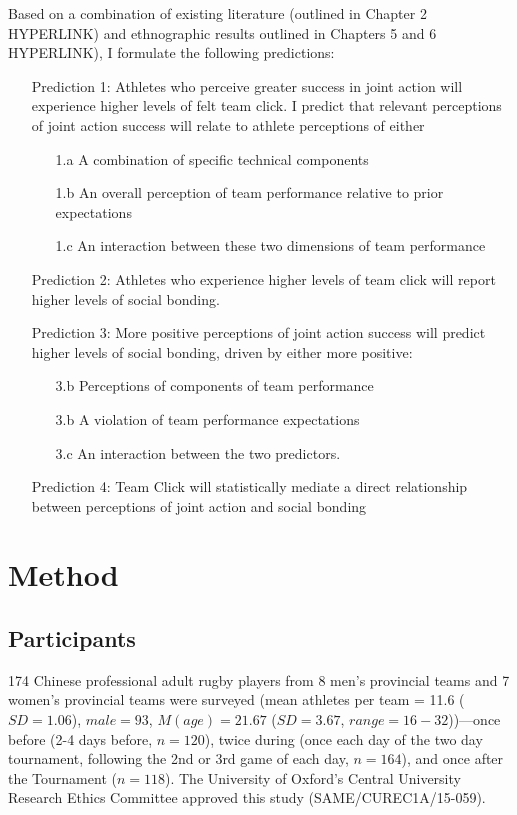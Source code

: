 \begin{CJK}{UTF8}{gbsn}
Based on a combination of existing literature (outlined in Chapter 2 HYPERLINK) and ethnographic results outlined in Chapters 5 and 6 HYPERLINK), I formulate the following predictions:

\begin{itemize}
  \item[Prediction 1:] Athletes who perceive greater success in joint action will experience higher levels of felt team click. I predict that relevant perceptions of joint action success will relate to athlete perceptions of either
      \begin{itemize}
        \item[1.a] A combination of specific technical components
        \item[1.b] An overall perception of team performance relative to prior expectations
        \item[1.c] An interaction between these two dimensions of team performance
      \end{itemize}
  \item[Prediction 2:] Athletes who experience higher levels of team click will report higher levels of social bonding.
  \item[Prediction 3:] More positive perceptions of joint action success will predict higher levels of social bonding, driven by either more positive:
    \begin{itemize}
        \item[3.b] Perceptions of components of team performance
    	  \item[3.b] A violation of team performance expectations
        \item[3.c] An interaction between the two predictors.
    \end{itemize}
  \item[Prediction 4:] Team Click will statistically mediate a direct relationship between perceptions of joint action and social bonding
\end{itemize}





\section{Method}
\subsection{Participants}
174 Chinese professional adult rugby players from 8 men’s provincial teams and 7 women’s provincial teams were surveyed  (mean athletes per team = 11.6 ($SD =1.06$), $male = 93$, $M(age) = 21.67$ ($SD = 3.67$, $range = 16 - 32$))---once before (2-4 days before, $n = 120$), twice during (once each day of the two day tournament, following the 2nd or 3rd game of each day, $n = 164$), and once after the Tournament ($n = 118$).  The University of Oxford’s Central University Research Ethics Committee approved this study (SAME/CUREC1A/15-059).


\end{CJK}
